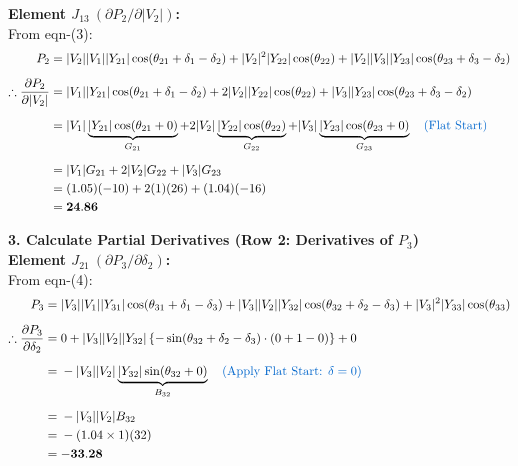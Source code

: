 \documentclass[11pt]{article}
\begin{document}
\begin{stepbox}
\newpage
\vspace{0.3cm}
\noindent \textbf{Element $J_{13} \ (\partial P_2 / \partial |V_2|)$:} \\
From eqn-(3):
\begin{align*}
    P_2 =\;& |V_2||V_1||Y_{21}| \cos(\theta_{21} + \delta_1 - \delta_2) + |V_2|^2|Y_{22}| \cos(\theta_{22}) + |V_2||V_3||Y_{23}| \cos(\theta_{23} + \delta_3 - \delta_2) \\[0.2cm]
    \therefore \frac{\partial P_2}{\partial |V_2|} =\;& |V_1||Y_{21}| \cos(\theta_{21} + \delta_1 - \delta_2) + 2|V_2||Y_{22}| \cos(\theta_{22}) + |V_3||Y_{23}| \cos(\theta_{23} + \delta_3 - \delta_2) \\[0.2cm]
    =\;& |V_1|\underbrace{|Y_{21}|\cos(\theta_{21} + 0)}_{G_{21}} + 2|V_2|\underbrace{|Y_{22}|\cos(\theta_{22})}_{G_{22}} + |V_3|\underbrace{|Y_{23}|\cos(\theta_{23} + 0)}_{G_{23}} \quad \text{\textcolor{mainblue}{(Flat Start)}} \\[0.2cm]
    =\;& |V_1|G_{21} + 2|V_2|G_{22} + |V_3|G_{23} \\
    =\;& (1.05)(-10) + 2(1)(26) + (1.04)(-16) \\
    =\;& \mathbf{24.86}
\end{align*}

\vspace{0.3cm}
\vspace{0.5cm}
\textbf{3. Calculate Partial Derivatives (Row 2: Derivatives of $P_3$)}\\
%
\noindent \textbf{Element $J_{21} \ (\partial P_3 / \partial \delta_2)$:} \\
From eqn-(4):
\begin{align*}
    P_3 =\;& |V_3||V_1||Y_{31}| \cos(\theta_{31} + \delta_1 - \delta_3) + |V_3||V_2||Y_{32}| \cos(\theta_{32} + \delta_2 - \delta_3) + |V_3|^2|Y_{33}| \cos(\theta_{33}) \\[0.2cm]
    \therefore \frac{\partial P_3}{\partial \delta_2} =\;& 0 + |V_3||V_2||Y_{32}| \left\{-\sin(\theta_{32} + \delta_2 - \delta_3) \cdot (0 + 1 - 0)\right\} + 0 \\[0.2cm]
    =\;& -|V_3||V_2|\underbrace{|Y_{32}|\sin(\theta_{32} + 0)}_{B_{32}} \quad \text{\textcolor{mainblue}{(Apply Flat Start: $\delta=0$)}} \\[0.2cm]
    =\;& -|V_3||V_2|B_{32} \\
    =\;& -(1.04 \times 1)(32) \\
    =\;& \mathbf{-33.28}
\end{align*}


\end{stepbox}
\end{document}
